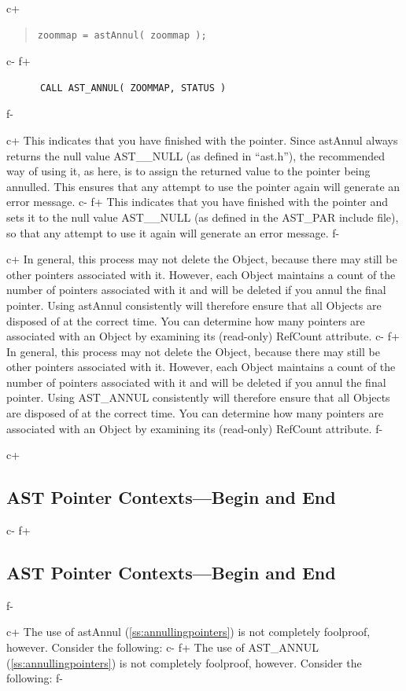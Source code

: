 \documentclass[twoside,11pt]{article}
\newcommand{\secref}[1]{\S\ref{#1}}
\renewcommand{\secref}[1]{\ref{#1}}
\begin{document}
c+
\begin{quote}
\small
\begin{verbatim}
zoommap = astAnnul( zoommap );
\end{verbatim}
\normalsize
\end{quote}
c-
f+
\small
\begin{verbatim}
      CALL AST_ANNUL( ZOOMMAP, STATUS )
\end{verbatim}
\normalsize
f-

c+
This indicates that you have finished with the pointer. Since astAnnul
always returns the null value AST\_\_NULL (as defined in ``ast.h''),
the recommended way of using it, as here, is to assign the returned
value to the pointer being annulled. This ensures that any attempt to
use the pointer again will generate an error message.
c-
f+
This indicates that you have finished with the pointer and sets it to
the null value AST\_\_NULL (as defined in the AST\_PAR include file),
so that any attempt to use it again will generate an error message.
f-

c+
In general, this process may not delete the Object, because there may
still be other pointers associated with it. However, each Object
maintains a count of the number of pointers associated with it and
will be deleted if you annul the final pointer. Using astAnnul
consistently will therefore ensure that all Objects are disposed of at
the correct time. You can determine how many pointers are associated
with an Object by examining its (read-only) RefCount attribute.
c-
f+
In general, this process may not delete the Object, because there may
still be other pointers associated with it. However, each Object
maintains a count of the number of pointers associated with it and
will be deleted if you annul the final pointer. Using AST\_ANNUL
consistently will therefore ensure that all Objects are disposed of at
the correct time. You can determine how many pointers are associated
with an Object by examining its (read-only) RefCount attribute.
f-

c+
\subsection{\label{ss:contexts}AST Pointer Contexts---Begin and End}
c-
f+
\subsection{\label{ss:contexts}AST Pointer Contexts---Begin and End}
f-

c+
The use of astAnnul (\secref{ss:annullingpointers}) is not completely
foolproof, however. Consider the following:
c-
f+
The use of AST\_ANNUL (\secref{ss:annullingpointers}) is not completely
foolproof, however. Consider the following:
f-
\end{document}
